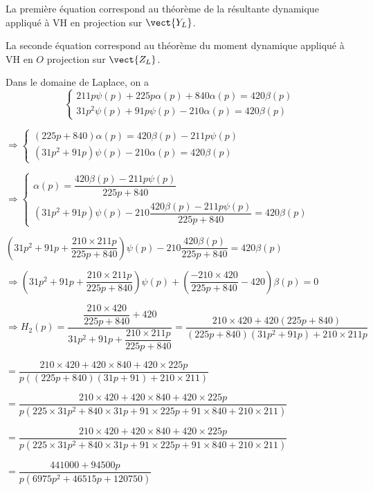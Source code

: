 \ifprof
\begin{corrige}
La première équation correspond au théorème de la résultante dynamique appliqué à VH en projection sur  $\vect{Y_L}$.

La seconde équation correspond au théorème du moment dynamique appliqué à VH en  $O$ projection sur  $\vect{Z_L}$.

\end{corrige}
\else
\fi
{}
\ifprof
\begin{corrige}
Dans le domaine de Laplace, on a 
$$
\left\{
\begin{array}{l}
211 p {\psi}(p)+225p{\alpha}(p)+840\alpha(p)=420\beta(p) \\
31p^2{\psi}(p)+91p{\psi}(p)-210\alpha(p)=420\beta(p) 
\end{array}
\right. $$

$
\Rightarrow \left\{
\begin{array}{l}
\left(225p+840\right)\alpha(p)=420\beta(p) - 211 p {\psi}(p)\\
\left(31p^2+91p\right){\psi}(p)-210\alpha(p)=420\beta(p) 
\end{array}
\right. $

$
\Rightarrow \left\{
\begin{array}{l}
\alpha(p)=\dfrac{420\beta(p) - 211 p {\psi}(p)}{225p+840}\\
\left(31p^2+91p\right){\psi}(p)-210\dfrac{420\beta(p) - 211 p {\psi}(p)}{225p+840}=420\beta(p) 
\end{array}
\right. $

$\left(31p^2+91p + \dfrac{210\times 211p}{225p+840}\right){\psi}(p)-210\dfrac{420\beta(p)}{225p+840}=420\beta(p) $

$\Rightarrow \left(31p^2+91p + \dfrac{210\times 211p}{225p+840}\right){\psi}(p)+\left(\dfrac{-210\times 420}{225p+840}-420\right)\beta(p)=0 $

$\Rightarrow H_2(p) = \dfrac{\dfrac{210\times 420}{225p+840}+420}{31p^2+91p + \dfrac{210\times 211p}{225p+840}} 
 = \dfrac{210\times 420+420\left(225p+840\right)}{\left(225p+840\right)\left(31p^2+91p \right)+ 210\times 211p}   $

$ = \dfrac{210\times 420+420\times 840+420\times 225p}{p\left(\left(225p+840\right)\left(31p+91 \right)+ 210\times 211\right)}   $


$ = \dfrac{210\times 420+420\times 840+420\times 225p}{p\left(225\times 31 p^2 
+840\times 31 p + 91 \times 225 p+91\times 840 + 210\times 211\right)}   $

$ = \dfrac{210\times 420+420\times 840+420\times 225p}{p\left(225\times 31 p^2 
+840\times 31 p + 91 \times 225 p+91\times 840 + 210\times 211\right)}   $

$ = \dfrac{441000+94500p}{p\left(6975  p^2 
+46515 p+120750\right)}   $
\end{corrige}
\else
\fi



